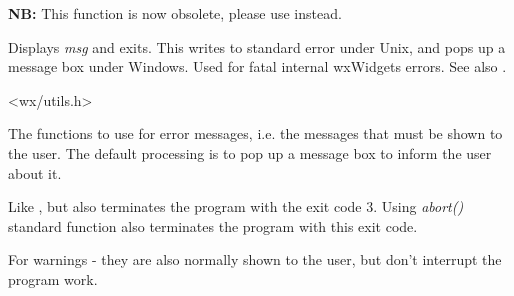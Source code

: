 \label{wxfatalerror}


{\bf NB:} This function is now obsolete, please use
 instead.

Displays {\it msg} and exits. This writes to standard error under Unix,
and pops up a message box under Windows. Used for fatal internal
wxWidgets errors. See also .


<wx/utils.h>


\label{wxlogerror}



The functions to use for error messages, i.e. the messages that must be shown
to the user. The default processing is to pop up a message box to inform the
user about it.


\label{wxlogfatalerror}



Like , but also
terminates the program with the exit code 3. Using {\it abort()} standard
function also terminates the program with this exit code.


\label{wxlogwarning}



For warnings - they are also normally shown to the user, but don't interrupt
the program work.


\label{wxlogmessage}



